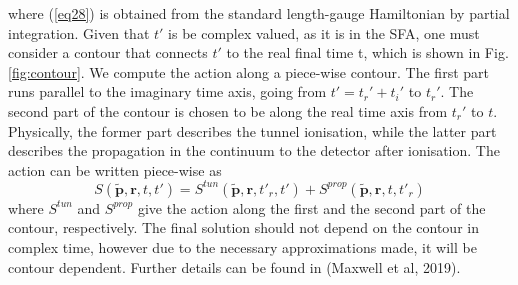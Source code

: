 \documentclass[11pt]{article}
\numberwithin{equation}{section}
\begin{document}
where (\ref{eq28}) is obtained from the standard length-gauge Hamiltonian by partial integration\cite{popruzhenko_2014_invariant}. 
Given that $t'$ is be complex valued, as it is in the SFA, one must consider a contour that connects $t'$ to the real final time t, which is shown in Fig. \ref{fig:contour}. We compute the action along a piece-wise contour. The first part runs parallel to the imaginary time axis, going from $t' = t_r' + t_i'$ to $t_r'$. The second part of the contour is chosen to be along the real time axis from $t_r'$ to $t$. Physically, the former part describes the tunnel ionisation, while the latter part describes the propagation in the continuum to the detector after ionisation.  The action can be written piece-wise as 
\begin{equation} \label{eq:terms_action}
    S(\tilde{\mathbf{p}}, \mathbf{r},t,t') = S^{tun}(\tilde{\mathbf{p}}, \mathbf{r},t'_r,t') + S^{prop} (\tilde{\mathbf{p}}, \mathbf{r},t,t'_r)
\end{equation}
where $S^{tun}$ and $S^{prop}$ give the action along the first and the second part of the contour, respectively. The final solution should not depend on the contour in complex time, however due to the necessary approximations made, it will be contour dependent. Further details can be found in (Maxwell et al, 2019)\cite{maxwell_2019_strongfield}.
\end{document}
